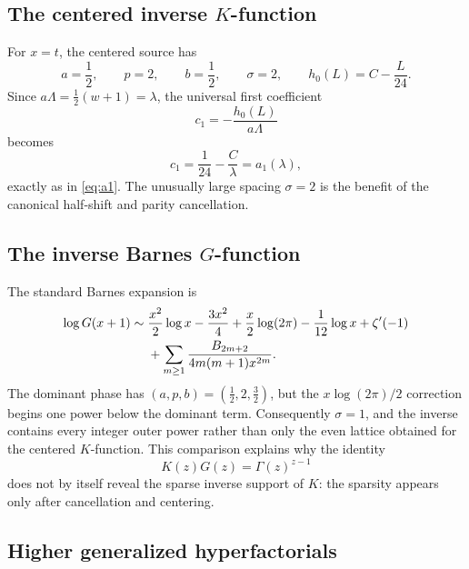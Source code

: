 \documentclass[11pt,oneside]{article}
\theoremstyle{plain}
\theoremstyle{definition}
\theoremstyle{remark}
\begin{document}
\subsection{The centered inverse \(K\)-function}

For \(x=t\), the centered source has
\begin{equation}
 a=\frac12,
 \qquad p=2,
 \qquad b=\frac12,
 \qquad \sigma=2,
 \qquad h_0(L)=C-\frac L{24}.
 \label{eq:K-general-parameters}
\end{equation}
Since \(a\Lambda=\tfrac12(w+1)=\lambda\), the universal first coefficient
\begin{equation}
 c_1=-\frac{h_0(L)}{a\Lambda}
 \label{eq:universal-c1}
\end{equation}
becomes
\begin{equation}
 c_1=\frac1{24}-\frac C\lambda=a_1(\lambda),
 \label{eq:K-c1-recovered}
\end{equation}
exactly as in \cref{eq:a1}.  The unusually large spacing \(\sigma=2\) is the
benefit of the canonical half-shift and parity cancellation.

\subsection{The inverse Barnes \(G\)-function}

The standard Barnes expansion is
\begin{align}
 \log G(x+1)
 \sim{}&\frac{x^2}{2}\log x-\frac{3x^2}{4}
 +\frac x2\log(2\pi)-\frac1{12}\log x+\zeta'(-1)
 \notag\\
 &+\sum_{m\ge1}\frac{B_{2m+2}}
 {4m(m+1)x^{2m}}.
 \label{eq:BarnesG-example}
\end{align}
The dominant phase has \((a,p,b)=(\tfrac12,2,\tfrac32)\), but the
\(x\log(2\pi)/2\) correction begins one power below the dominant term.
Consequently \(\sigma=1\), and the inverse contains every integer outer power
rather than only the even lattice obtained for the centered \(K\)-function.
This comparison explains why the identity
\begin{equation}
 K(z)G(z)=\Gamma(z)^{z-1}
 \label{eq:K-G-comparison}
\end{equation}
does not by itself reveal the sparse inverse support of \(K\): the sparsity
appears only after cancellation and centering.

\subsection{Higher generalized hyperfactorials}
\end{document}
